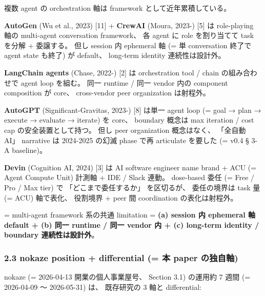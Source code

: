 \documentclass[
]{article}
\begin{document}
複数 agent の orchestration 軸は framework として近年累積している。

\textbf{AutoGen} (Wu et al., 2023) {[}11{]} + \textbf{CrewAI} (Moura,
2023-) {[}5{]} は role-playing 軸の multi-agent conversation framework、
各 agent に role を割り当てて task を分解 + 委譲する。 但し session 内
ephemeral 軸 (= 単 conversation 終了で agent state も終了) が default、
long-term identity 連続性は設計外。

\textbf{LangChain agents} (Chase, 2022-) {[}2{]} は orchestration tool /
chain の組み合わせで agent loop を組む。 同一 runtime / 同一 vendor 内の
component composition が core、 cross-vendor peer organization
は射程外。

\textbf{AutoGPT} (Significant-Gravitas, 2023-) {[}8{]} は単一 agent loop
(= goal → plan → execute → evaluate → iterate) を core、 boundary 概念は
max iteration / cost cap の安全装置として持つ。 但し peer organization
概念はなく、 「全自動 AI」 narrative は 2024-2025 の幻滅 phase で再
articulate を要した (= v0.4 § 3-A baseline)。

\textbf{Devin} (Cognition AI, 2024) {[}3{]} は AI software engineer name
brand + ACU (= Agent Compute Unit) 計測軸 + IDE / Slack 連動。
dose-based 委任 (= Free / Pro / Max tier) で 「どこまで委任するか」
を区切るが、 委任の境界は task 量 (= ACU) 軸で表化、 役割境界 + peer 間
coordination の表化は射程外。

= multi-agent framework 系の共通 limitation = \textbf{(a) session 内
ephemeral 軸 default + (b) 同一 runtime / 同一 vendor 内 + (c) long-term
identity / boundary 連続性は設計外}。

\subsubsection{2.3 nokaze position + differential (= 本 paper
の独自軸)}\label{nokaze-position-differential-ux672c-paper-ux306eux72ecux81eaux8ef8}

nokaze (= 2026-04-13 開業の個人事業屋号、 Section 3.1) の運用約 7 週間
(= 2026-04-09 〜 2026-05-31) は、 既存研究の 3 軸と differential:
\end{document}
